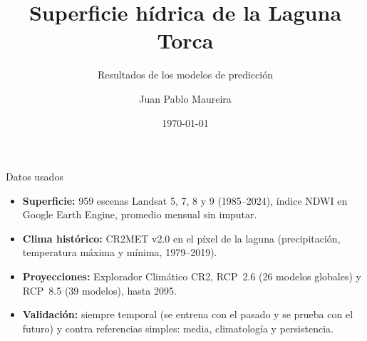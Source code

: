 \documentclass[10pt]{beamer}
\title[Laguna Torca: resultados]{Superficie hídrica de la Laguna Torca}
\subtitle{Resultados de los modelos de predicción}
\author[J. P. Maureira]{Juan Pablo Maureira}
\institute[UTalca]{Magíster en Data Science\\Universidad de Talca}
\date{\today}
\begin{document}
\begin{frame}
\titlepage
\end{frame}

\begin{frame}{Datos usados}
\begin{itemize}
\item \textbf{Superficie:} 959 escenas Landsat 5, 7, 8 y 9 (1985--2024), índice NDWI en Google Earth Engine, promedio mensual sin imputar.
\item \textbf{Clima histórico:} CR2MET v2.0 en el píxel de la laguna (precipitación, temperatura máxima y mínima, 1979--2019).
\item \textbf{Proyecciones:} Explorador Climático CR2, RCP~2.6 (26 modelos globales) y RCP~8.5 (39 modelos), hasta 2095.
\item \textbf{Validación:} siempre temporal (se entrena con el pasado y se prueba con el futuro) y contra referencias simples: media, climatología y persistencia.
\end{itemize}
\end{frame}
\end{document}
